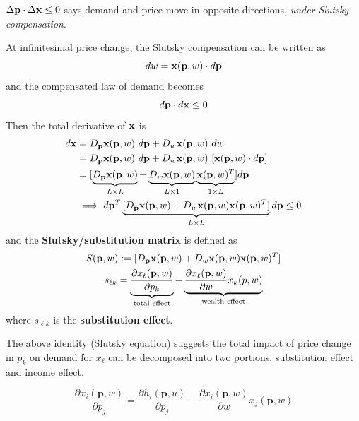 \documentclass{report}
\begin{document}
 			\begin{corollary}
 				$\Delta \textbf{p} \cdot \Delta \textbf{x} \leq 0$ says demand and price move in opposite directions, \emph{under Slutsky compensation}.
 			\end{corollary}
 			
 			\begin{definition}
 				At infinitesimal price change, the Slutsky compensation can be written as 
 				\begin{equation}
 					dw = \textbf{x}(\textbf{p}, w) \cdot d\textbf{p}
 				\end{equation}
 				and the compensated law of demand becomes
 				\begin{equation}
 					d\textbf{p} \cdot d\textbf{x} \leq 0
 				\end{equation}
 				Then the total derivative of $\textbf{x}$ is 
 				\begin{align}
 					d\textbf{x} &= D_{\textbf{p}}\textbf{x}(\textbf{p}, w)\ d\textbf{p} + D_w \textbf{x}(\textbf{p}, w)\ dw \\
 					&= D_{\textbf{p}}\textbf{x}(\textbf{p}, w)\ d\textbf{p} + D_w \textbf{x} (\textbf{p}, w)\ [\textbf{x}(\textbf{p}, w) \cdot d\textbf{p}] \\
 					&= [\underbrace{D_{\textbf{p}}\textbf{x}(\textbf{p}, w)}_{L \times L} + \underbrace{D_w \textbf{x} (\textbf{p}, w)}_{L \times 1} \underbrace{\textbf{x}(\textbf{p}, w)^T}_{1 \times L}] d\textbf{p} \\
 					&\implies d\textbf{p}^T 
 					\underbrace{[D_{\textbf{p}}\textbf{x}(\textbf{p}, w) + D_w \textbf{x} (\textbf{p}, w) \textbf{x}(\textbf{p}, w)^T]}_{L \times L} d\textbf{p} \leq 0
 				\end{align}
 				and the \textbf{Slutsky/substitution matrix} is defined as
 				\begin{gather}
 					S(\textbf{p}, w) := [D_{\textbf{p}}\textbf{x}(\textbf{p}, w) + D_w \textbf{x} (\textbf{p}, w) \textbf{x}(\textbf{p}, w)^T] \\
 					s_{\ell k} = \underbrace{\frac{\partial{x_\ell(\textbf{p}, w)}}{\partial{p_k}}}_{\text{{total effect}}} + \underbrace{\frac{\partial{x_\ell(\textbf{p}, w)}}{\partial{w}} x_k (p, w)}_{\text{{wealth effect}}}
 				\end{gather}
 				where $s_{\ell k}$ is the \textbf{substitution effect}.
 			\end{definition}
 			
 			\begin{remark}
 				The above identity (Slutsky equation) suggests the total impact of price change in $p_k$ on demand for $x_{\ell}$ can be decomposed into two portions, substitution effect and income effect.
 			\end{remark}
 			
  			\begin{corollary}
 				\begin{equation}
 					\frac{\partial x_{i}(\mathbf{p}, w)}{\partial p_{j}}=\frac{\partial h_{i}(\mathbf{p}, u)}{\partial p_{j}}-\frac{\partial x_{i}(\mathbf{p}, w)}{\partial w} x_{j}(\mathbf{p}, w)
 				\end{equation}
 			\end{corollary}
 			
\end{document}
